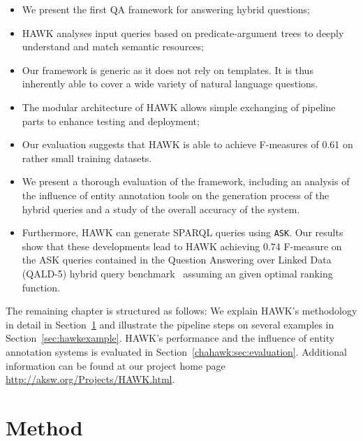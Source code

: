  \begin{itemize}
 \item We present the first \ac{QA} framework for answering hybrid questions;
 \item HAWK analyses input queries based on predicate-argument trees to deeply understand and match semantic resources;
 \item Our framework is generic as it does not rely on templates. It is thus inherently able to cover a wide variety of natural language questions. %
 \item The modular architecture of HAWK allows simple exchanging of pipeline parts to enhance testing and deployment;
 \item Our evaluation suggests that HAWK is able to achieve F-measures of 0.61 on rather small training datasets.
 \item We present a thorough evaluation of the framework, including an analysis of the influence of entity annotation tools on the generation process of the hybrid queries and a study of the overall accuracy of the system. 
 \item Furthermore, HAWK can generate SPARQL queries using \texttt{ASK}. Our results show that these developments lead to HAWK achieving 0.74 F-measure on the ASK queries contained in the Question Answering over Linked Data (\ac{QALD}-5) hybrid query benchmark~\cite{qald5} assuming an given optimal ranking function.
 \end{itemize}

The remaining chapter is structured as follows:
We explain HAWK's methodology in detail in Section~\ref{chahawk:sec:method} and illustrate the pipeline steps on several examples in Section~\ref{sec:hawkexample}.
HAWK's performance and the influence of entity annotation systems is evaluated in Section~\ref{chahawk:sec:evaluation}. 
Additional information can be found at our project home page \url{http://aksw.org/Projects/HAWK.html}.

\section{Method}
\label{chahawk:sec:method}

